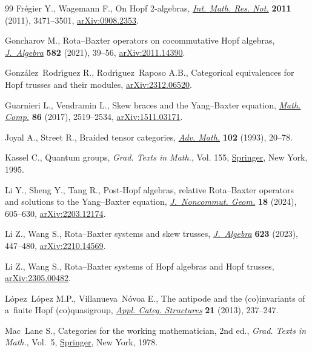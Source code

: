 \begin{thebibliography}{99}
Fr\'egier Y., Wagemann F., On {H}opf 2-algebras, \href{https://doi.org/10.1093/imrn/rnq224}{\textit{Int. Math. Res. Not.}}
 \textbf{2011} (2011), 3471--3501, \href{https://arxiv.org/abs/0908.2353}{arXiv:0908.2353}.

Goncharov M., Rota--{B}axter operators on cocommutative {H}opf algebras,
 \href{https://doi.org/10.1016/j.jalgebra.2021.04.024}{\textit{J.~Algebra}} \textbf{582} (2021), 39--56, \href{https://arxiv.org/abs/2011.14390}{arXiv:2011.14390}.

Gonz\'alez~Rodr\'{\i}guez R., Rodr\'{\i}guez~Raposo A.B., Categorical
 equivalences for Hopf trusses and their modules, \href{https://arxiv.org/abs/2312.06520}{arXiv:2312.06520}.

Guarnieri L., Vendramin L., Skew braces and the {Y}ang--{B}axter equation,
 \href{https://doi.org/10.1090/mcom/3161}{\textit{Math. Comp.}} \textbf{86} (2017), 2519--2534, \href{https://arxiv.org/abs/1511.03171}{arXiv:1511.03171}.

Joyal A., Street R., Braided tensor categories, \href{https://doi.org/10.1006/aima.1993.1055}{\textit{Adv. Math.}}
 \textbf{102} (1993), 20--78.

Kassel C., Quantum groups, \textit{Grad. Texts in Math.}, Vol. 155, \href{https://doi.org/10.1007/978-1-4612-0783-2}{Springer},
 New York, 1995.

Li Y., Sheng Y., Tang R., Post-{H}opf algebras, relative {R}ota--{B}axter
 operators and solutions to the {Y}ang--{B}axter equation,
 \href{https://doi.org/10.4171/jncg/537}{\textit{J.~Noncommut. Geom.}} \textbf{18} (2024), 605--630,
 \href{https://arxiv.org/abs/2203.12174}{arXiv:2203.12174}.

Li Z., Wang S., Rota--{B}axter systems and skew trusses, \href{https://doi.org/10.1016/j.jalgebra.2023.02.022}{\textit{J.~Algebra}}
 \textbf{623} (2023), 447--480, \href{https://arxiv.org/abs/2210.14569}{arXiv:2210.14569}.

Li Z., Wang S., {R}ota--{B}axter systems of {H}opf algebras and {H}opf trusses,
 \href{https://arxiv.org/abs/2305.00482}{arXiv:2305.00482}.

L\'opez~L\'opez M.P., Villanueva~N\'ovoa E., The antipode and the
 (co)invariants of a~finite {H}opf (co)quasigroup, \href{https://doi.org/10.1007/s10485-011-9260-5}{\textit{Appl. Categ.
 Structures}} \textbf{21} (2013), 237--247.

Mac~Lane S., Categories for the working mathematician, 2nd ed., \textit{Grad. Texts in
 Math.}, Vol.~5, \href{https://doi.org/10.1007/978-1-4757-4721-8}{Springer}, New York, 1978.


\end{thebibliography}
